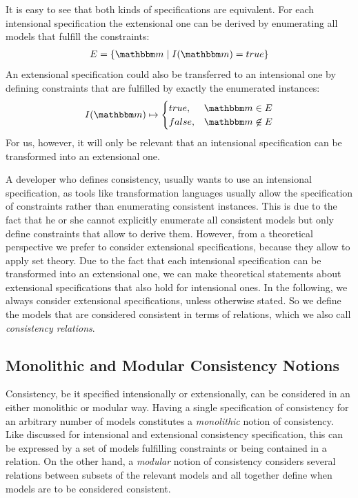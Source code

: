 It is easy to see that both kinds of specifications are equivalent. For each intensional specification the extensional one can be derived by enumerating all models that fulfill the constraints:
\begin{align*}
    E = \setted{\modelset{m} \mid I(\modelset{m}) = true}
\end{align*}
An extensional specification could also be transferred to an intensional one by defining constraints that are fulfilled by exactly the enumerated instances:
\begin{align*}
    I(\modelset{m}) \mapsto 
    \begin{cases} 
        true, & \modelset{m} \in E\\
        false, & \modelset{m} \not\in E\\
    \end{cases}
\end{align*}
For us, however, it will only be relevant that an intensional specification can be transformed into an extensional one.

A developer who defines consistency, usually wants to use an intensional specification, as tools like transformation languages usually allow the specification of constraints rather than enumerating consistent instances. This is due to the fact that he or she cannot explicitly enumerate all consistent models but only define constraints that allow to derive them.
However, from a theoretical perspective we prefer to consider extensional specifications, because they allow to apply set theory.
Due to the fact that each intensional specification can be transformed into an extensional one, we can make theoretical statements about extensional specifications that also hold for intensional ones.
In the following, we always consider extensional specifications, unless otherwise stated.
So we define the models that are considered consistent in terms of relations, which we also call \emph{\glspl{consistency relation}}.


\subsection{Monolithic and Modular Consistency Notions}
\label{chap:correctness:notions_consistency:monolithic_modular}

Consistency, be it specified intensionally or extensionally, can be considered in an either monolithic or modular way.
Having a single specification of consistency for an arbitrary number of models constitutes a \emph{monolithic} notion of consistency.
Like discussed for intensional and extensional consistency specification, this can be expressed by a set of models fulfilling constraints or being contained in a relation.
On the other hand, a \emph{modular} notion of consistency considers several relations between subsets of the relevant models and all together define when models are to be considered consistent.

